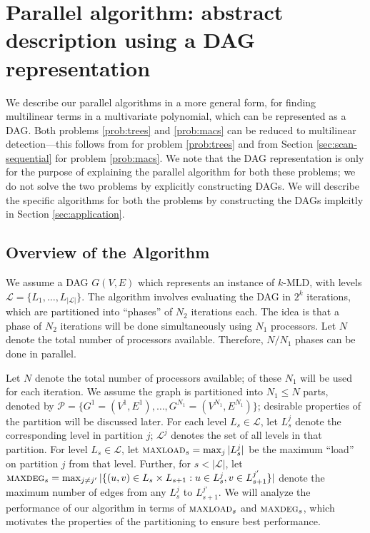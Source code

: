 
\section{Parallel algorithm: abstract description using a DAG representation}
\label{sec:proposed}

We describe our parallel algorithms in a more general form, for finding multilinear
terms in a multivariate polynomial, which can be represented as a DAG. 
Both problems \ref{prob:trees} and \ref{prob:macs} can be reduced to multilinear detection---this
follows from \cite{koutis:icalp08,williams2009finding} for problem \ref{prob:trees} and
from Section \ref{sec:scan-sequential} for problem \ref{prob:macs}. 
We note that the DAG representation
is only for the purpose of explaining the parallel algorithm for both these problems; we do not
solve the two problems by explicitly constructing DAGs. We will describe the specific algorithms
for both the problems by constructing the DAGs implcitly in Section \ref{sec:application}.

\subsection{Overview of the Algorithm}
We assume a DAG $G(V,E)$ which represents an instance of $k$-MLD, with levels
$\mathcal{L} = \{L_1,\ldots,L_{|\mathcal{L}|}\}$. The algorithm involves evaluating the
DAG in $2^k$ iterations, which are partitioned into ``phases'' of $N_2$ iterations each.
The idea is that a phase of $N_2$ iterations will be done simultaneously using $N_1$
processors. Let $N$ denote the total number of processors available. Therefore, $N/N_1$
phases can be done in parallel.

Let $N$ denote the total number
of processors available; of these $N_1$ will be used for each iteration. 
We assume the graph is partitioned into $N_1\leq N$ parts, denoted by
$\mathcal{P}=\{G^1= (V^1, E^1), \ldots, G^{N_1}=(V^{N_1}, E^{N_1})\}$; desirable properties of
the partition will be discussed later.
For each level $L_s\in\mathcal{L}$, let $L_s^j$ denote the corresponding level
in partition $j$; $\mathcal{L}^j$ denotes the set of all levels in that partition.
For level $L_s\in\mathcal{L}$, let $\textsc{maxload}{}_s = \max_j |L_s^j|$ be the maximum
``load'' on partition $j$ from that level. Further, for $s<|\mathcal{L}|$, let
$\textsc{maxdeg}{}_s = \max_{j\neq j'} |\{(u, v)\in L_s\times L_{s+1}: u\in L_s^j, v\in L_{s+1}^{j'}\}|$
denote the maximum number of edges from any $L_s^j$ to $L_{s+1}^{j'}$.
We will analyze the performance of our algorithm in terms of $\textsc{maxload}{}_s$ 
and $\textsc{maxdeg}{}_s$,
which motivates the properties of the partitioning to ensure best performance.

